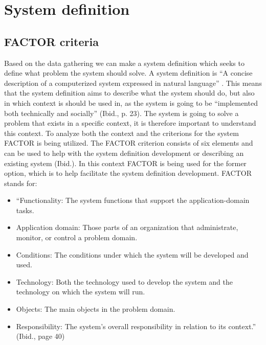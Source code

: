 \section{System definition}
\subsection{FACTOR criteria}

Based on the data gathering we can make a system definition which seeks to define what problem the system should solve. A system definition is “A concise description of a computerized system expressed in natural language” \citep[p.~24]{Rod-Aalborg}. This means that the system definition aims to describe what the system should do, but also in which context is should be used in, as the system is going to be “implemented both technically and socially” (Ibid., p. 23). The system is going to solve a problem that exists in a specific context, it is therefore important to understand this context.
To analyze both the context and the criterions for the system FACTOR is being utilized. The FACTOR criterion consists of six elements and can be used to help with the system definition development or describing an existing system (Ibid.). In this context FACTOR is being used for the former option, which is to help facilitate the system definition development. FACTOR stands for:

\begin{itemize}
\item “Functionality: The system functions that support the application-domain tasks.

\item Application domain: Those parts of an organization that administrate, monitor, or control a problem domain.

\item Conditions: The conditions under which the system will be developed and used.

\item Technology: Both the technology used to develop the system and the technology on which the system will run.

\item Objects: The main objects in the problem domain.

\item Responsibility: The system’s overall responsibility in relation to its context.” (Ibid., page 40)
\end{itemize}



